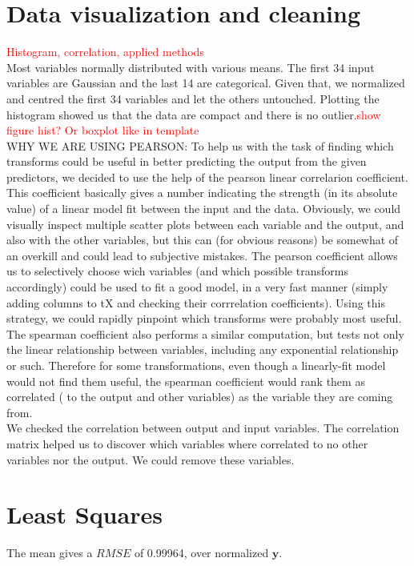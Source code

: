 \documentclass{article} %
\begin{document}
\section{Data visualization and cleaning}
\textcolor{red}{Histogram, correlation, applied methods}\\
Most variables normally distributed with various means. The first 34 input variables are Gaussian and the last 14 are categorical. Given that, we normalized and centred the first 34 variables and let the others untouched. Plotting the histogram showed us that the data are compact and there is no outlier.\textcolor{red}{show figure hist? Or boxplot like in template}\\
WHY WE ARE USING PEARSON:
To help us with the task of finding which transforms could be useful in better predicting the output from the given predictors, we decided to use the help of the pearson linear correlarion coefficient. This coefficient basically gives a number indicating the strength (in its absolute value) of a linear model fit between the input and the data. Obviously, we could visually inspect multiple scatter plots between each variable and the output, and also with the other variables, but this can (for obvious reasons) be somewhat of an overkill and could lead to subjective mistakes. The pearson coefficient allows us to selectively choose wich variables (and which possible transforms accordingly) could be used to fit a good model, in a very fast manner (simply adding columns to tX and checking their corrrelation coefficients). Using this strategy, we could rapidly pinpoint which transforms were probably most useful. The spearman coefficient also performs a similar computation, but tests not only the linear relationship between variables, including any exponential relationship or such. Therefore for some transformations, even though a linearly-fit model would not find them useful, the spearman coefficient would rank them as correlated ( to the output and other variables) as the variable they are coming from.\\

We checked the correlation between output and input variables. The correlation matrix helped us to discover which variables where correlated to no other variables nor the output. We could remove these variables.
\section{Least Squares}
The mean gives a $RMSE$ of 0.99964, over normalized $\mathbf{y}$.\\
\end{document}

